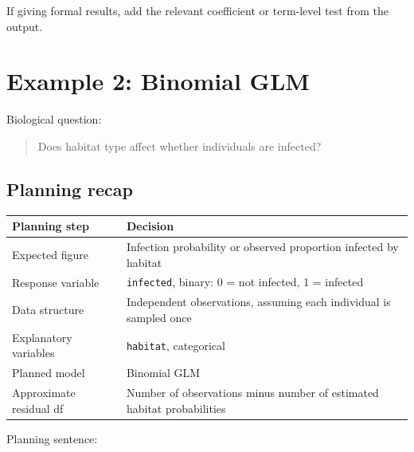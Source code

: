 \documentclass[
  letterpaper,
  8pt,
  a4paper]{book}
\newcounter{none} %
\begin{document}
If giving formal results, add the relevant coefficient or term-level
test from the output.

\section*{Example 2: Binomial GLM}\label{example-2-binomial-glm}


Biological question:

\begin{quote}
Does habitat type affect whether individuals are infected?
\end{quote}

\subsection*{Planning recap}\label{planning-recap-1}

{\def\LTcaptype{none} %
\begin{longtable}[]{@{}
  >{\raggedright\arraybackslash}p{}
  >{\raggedright\arraybackslash}p{}@{}}
\toprule\noalign{}
\begin{minipage}[b]{\linewidth}\raggedright
Planning step
\end{minipage} & \begin{minipage}[b]{\linewidth}\raggedright
Decision
\end{minipage} \\
\midrule\noalign{}
\endhead
\bottomrule\noalign{}
\endlastfoot
Expected figure & Infection probability or observed proportion infected
by habitat \\
Response variable & \texttt{infected}, binary: 0 = not infected, 1 =
infected \\
Data structure & Independent observations, assuming each individual is
sampled once \\
Explanatory variables & \texttt{habitat}, categorical \\
Planned model & Binomial GLM \\
Approximate residual df & Number of observations minus number of
estimated habitat probabilities \\
\end{longtable}
}

Planning sentence:
\end{document}
